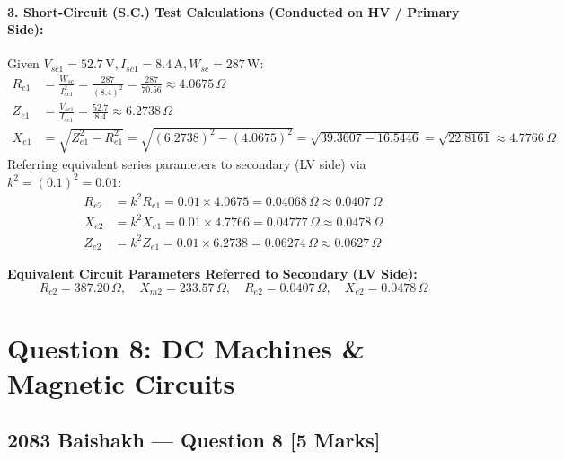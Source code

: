 \documentclass[11pt,a4paper,oneside]{article}
\begin{document}
\paragraph{3. Short-Circuit (S.C.) Test Calculations (Conducted on HV / Primary Side):}
Given $V_{sc1} = 52.7\,\mathrm{V}, I_{sc1} = 8.4\,\mathrm{A}, W_{sc} = 287\,\mathrm{W}$:
\begin{align*}
  R_{e1} &= \frac{W_{sc}}{I_{sc1}^2} = \frac{287}{(8.4)^2} = \frac{287}{70.56} \approx 4.0675\,\Omega \\
  Z_{e1} &= \frac{V_{sc1}}{I_{sc1}} = \frac{52.7}{8.4} \approx 6.2738\,\Omega \\
  X_{e1} &= \sqrt{Z_{e1}^2 - R_{e1}^2} = \sqrt{(6.2738)^2 - (4.0675)^2} = \sqrt{39.3607 - 16.5446} = \sqrt{22.8161} \approx 4.7766\,\Omega
\end{align*}
Referring equivalent series parameters to secondary (LV side) via $k^2 = (0.1)^2 = 0.01$:
\begin{align}
  R_{e2} &= k^2 R_{e1} = 0.01 \times 4.0675 = 0.04068\,\Omega \approx 0.0407\,\Omega \\
  X_{e2} &= k^2 X_{e1} = 0.01 \times 4.7766 = 0.04777\,\Omega \approx 0.0478\,\Omega \\
  Z_{e2} &= k^2 Z_{e1} = 0.01 \times 6.2738 = 0.06274\,\Omega \approx 0.0627\,\Omega
\end{align}

\begin{answerbox}
\textbf{Equivalent Circuit Parameters Referred to Secondary (LV Side):}
\[
R_{c2} = 387.20\,\Omega, \quad X_{m2} = 233.57\,\Omega, \quad R_{e2} = 0.0407\,\Omega, \quad X_{e2} = 0.0478\,\Omega
\]
\end{answerbox}

\newpage

\section{Question 8: DC Machines \& Magnetic Circuits}

\subsection{2083 Baishakh --- Question 8 [5 Marks]}
\end{document}

